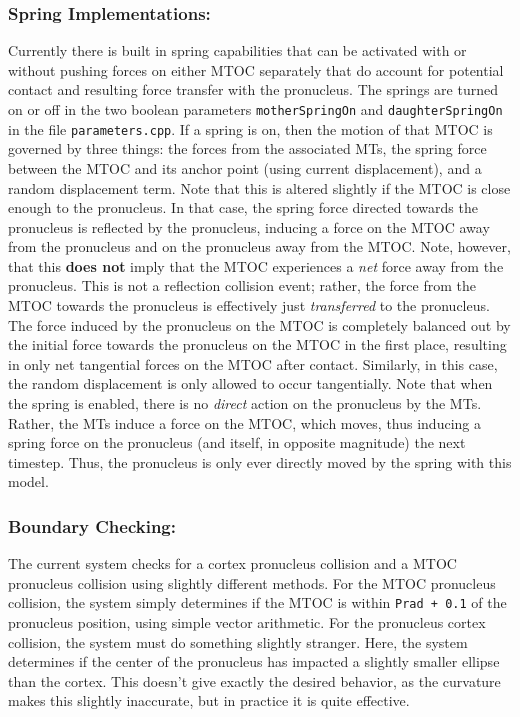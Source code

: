\documentclass{article}
\begin{document}
\subsubsection{Spring Implementations:}
Currently there is built in spring capabilities that can be activated with or
without pushing forces on either MTOC separately that do account for potential
contact and resulting force transfer with the pronucleus. The springs are turned
on or off in the two boolean parameters \texttt{motherSpringOn} and
\texttt{daughterSpringOn} in the file \texttt{parameters.cpp}. If a spring is
on, then the motion of that MTOC is governed by three things: the forces from
the associated MTs, the spring force between the MTOC and its anchor point
(using current displacement), and a random displacement term. Note that this is
altered slightly if the MTOC is close enough to the pronucleus. In that case,
the spring force directed towards the pronucleus is reflected by the pronucleus,
inducing a force on the MTOC away from the pronucleus and on the pronucleus away
from the MTOC. Note, however, that this \textbf{does not} imply that the MTOC
experiences a \emph{net} force away from the pronucleus. This is not a
reflection collision event; rather, the force from the MTOC towards the
pronucleus is effectively just \emph{transferred} to the pronucleus. The force
induced by the pronucleus on the MTOC is completely balanced out by the initial
force towards the pronucleus on the MTOC in the first place, resulting in only
net tangential forces on the MTOC after contact. Similarly, in this case, the
random displacement is only allowed to occur tangentially. Note that when the
spring is enabled, there is no \emph{direct} action on the pronucleus by the
MTs. Rather, the MTs induce a force on the MTOC, which moves, thus inducing a
spring force on the pronucleus (and itself, in opposite magnitude) the next
timestep. Thus, the pronucleus is only ever directly moved by the spring with
this model. 
\subsubsection{Boundary Checking:}
The current system checks for a cortex pronucleus collision and a MTOC
pronucleus collision using slightly different methods. For the MTOC pronucleus
collision, the system simply determines if the MTOC is within \texttt{Prad +
0.1} of the pronucleus position, using simple vector arithmetic. For the
pronucleus cortex collision, the system must do something slightly stranger.
Here, the system determines if the center of the pronucleus has impacted a
slightly smaller ellipse than the cortex. This doesn't give exactly the desired
behavior, as the curvature makes this slightly inaccurate, but in practice it is
quite effective. 
\end{document}
